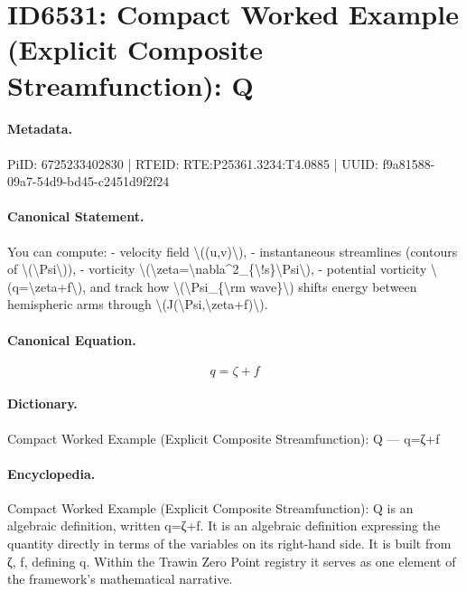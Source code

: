 \section*{ID6531: Compact Worked Example (Explicit Composite Streamfunction): Q}
\paragraph{Metadata.}
PiID: 6725233402830 | RTEID: RTE:P25361.3234:T4.0885 | UUID: f9a81588-09a7-54d9-bd45-c2451d9f2f24

\paragraph{Canonical Statement.}
You can compute: - velocity field \textbackslash{}((u,v)\textbackslash{}), - instantaneous streamlines (contours of \textbackslash{}(\textbackslash{}Psi\textbackslash{})), - vorticity \textbackslash{}(\textbackslash{}zeta=\textbackslash{}nabla\textasciicircum{}2\_\{\textbackslash{}!s\}\textbackslash{}Psi\textbackslash{}), - potential vorticity \textbackslash{}(q=\textbackslash{}zeta+f\textbackslash{}), and track how \textbackslash{}(\textbackslash{}Psi\_\{\textbackslash{}rm wave\}\textbackslash{}) shifts energy between hemispheric arms through \textbackslash{}(J(\textbackslash{}Psi,\textbackslash{}zeta+f)\textbackslash{}).

\paragraph{Canonical Equation.}
\[
q=\zeta+f
\]

\paragraph{Dictionary.}
Compact Worked Example (Explicit Composite Streamfunction): Q — q=ζ+f

\paragraph{Encyclopedia.}
Compact Worked Example (Explicit Composite Streamfunction): Q is an algebraic definition, written q=ζ+f. It is an algebraic definition expressing the quantity directly in terms of the variables on its right-hand side. It is built from ζ, f, defining q. Within the Trawin Zero Point registry it serves as one element of the framework's mathematical narrative.
